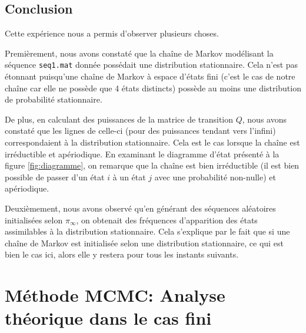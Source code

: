 \documentclass[a4paper, 12pt]{report}
\def\MCMC{MCMC}
\begin{document}
    \subsection{Conclusion}
    Cette expérience nous a permis d'observer plusieurs choses.\par
    Premièrement, nous avons constaté que la chaîne de Markov modélisant la séquence \texttt{seq1.mat} donnée possédait une distribution stationnaire. Cela n'est pas étonnant puisqu'une chaîne de Markov à espace d'états fini (c'est le cas de notre chaîne car elle ne possède que 4 états distincts) possède au moins une distribution de probabilité stationnaire.\par
    De plus, en calculant des puissances de la matrice de transition $Q$, nous avons constaté que les lignes de celle-ci (pour des puissances tendant vers l'infini) correspondaient à la distribution stationnaire. Cela est le cas lorsque la chaîne est irréductible et apériodique. En examinant le diagramme d'état présenté à la figure \ref{fig:diagramme}, on remarque que la chaîne est bien irréductible (il est bien possible de passer d'un état $i$ à un état $j$ avec une probabilité non-nulle) et apériodique. \par
    Deuxièmement, nous avons observé qu'en générant des séquences aléatoires initialisées selon $\pi_\infty$, on obtenait des fréquences d'apparition des états assimilables à la distribution stationnaire. Cela s'explique par le fait que si une chaîne de Markov est initialisée selon une distribution stationnaire, ce qui est bien le cas ici, alors elle y restera pour tous les instants suivants.
	\section{Méthode \MCMC : Analyse théorique dans le cas fini}
\end{document}
